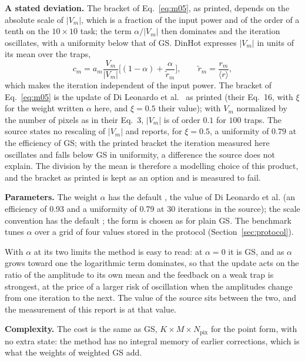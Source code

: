 \textbf{A stated deviation.} The bracket of Eq.~\eqref{eq:m05}, as printed, depends on the absolute scale of $|V_m|$, which is a fraction of the input power and of the order of a tenth on the $10\times10$ task; the term $\alpha/|V_m|$ then dominates and the iteration oscillates, with a uniformity below that of GS. DinHot expresses $|V_m|$ in units of its mean over the traps,
\begin{equation}
c_m=a_m\frac{V_m}{|V_m|}\Big[(1-\alpha)+\frac{\alpha}{\tilde r_m}\Big],\qquad \tilde r_m=\frac{r_m}{\langle r\rangle},
\label{eq:m05-scale}
\end{equation}
which makes the iteration independent of the input power. The bracket of Eq.~\eqref{eq:m05} is the update of Di Leonardo et al.~\cite{dileonardo} as printed (their Eq.~16, with $\xi$ for the weight written $\alpha$ here, and $\xi=0.5$ their value); with $V_m$ normalized by the number of pixels as in their Eq.~3, $|V_m|$ is of order $0.1$ for $100$ traps. The source states no rescaling of $|V_m|$ and reports, for $\xi=0.5$, a uniformity of $0.79$ at the efficiency of GS; with the printed bracket the iteration measured here oscillates and falls below GS in uniformity, a difference the source does not explain. The division by the mean is therefore a modelling choice of this product, and the bracket as printed is kept as an option and is measured to fail.

\textbf{Parameters.} The weight $\alpha$ has the default , the value of Di Leonardo et al. (an efficiency of 0.93 and a uniformity of 0.79 at 30 iterations in the source); the scale convention has the default \texttt{}; the form is chosen as for plain GS. The benchmark tunes $\alpha$ over a grid of four values stored in the protocol (Section~\ref{sec:protocol}).

With $\alpha$ at its two limits the method is easy to read: at $\alpha=0$ it is GS, and as $\alpha$ grows toward one the logarithmic term dominates, so that the update acts on the ratio of the amplitude to its own mean and the feedback on a weak trap is strongest, at the price of a larger risk of oscillation when the amplitudes change from one iteration to the next. The value of the source sits between the two, and the measurement of this report is at that value.

\textbf{Complexity.} The cost is the same as GS, $K\times M\times N_{\mathrm{pix}}$ for the point form, with no extra state: the method has no integral memory of earlier corrections, which is what the weights of weighted GS add.

